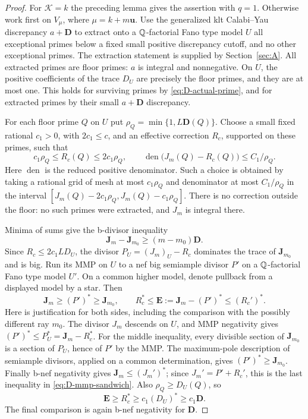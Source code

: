 \begin{proof}
For $\mathcal K=k$ the preceding lemma gives the assertion with $q=1$.
Otherwise work first on $V_\mu$, where $\mu=k+m\mathbf u$.  Use the
generalized klt Calabi--Yau discrepancy $a+\mathbf D$ to extract onto a
$\mathbb Q$-factorial Fano type model $U$ all exceptional primes below a fixed
small positive discrepancy cutoff, and no other exceptional primes.
The extraction statement is supplied by Section~\ref{sec:A}.
All extracted primes are floor primes: $a$ is integral and nonnegative.
On $U$, the positive coefficients of the trace $D_U$ are precisely the
floor primes, and they are at most one.  This holds for surviving primes
by \eqref{eq:D-actual-prime}, and for extracted primes by their small
$a+\mathbf D$ discrepancy.

For each floor prime $Q$ on $U$ put
$\rho_Q=\min\{1,L\mathbf D(Q)\}$.  Choose a small fixed rational
$c_1>0$, with $2c_1\le c$, and an effective correction $R_c$, supported
on these primes, such that
\begin{equation}\label{eq:D-rounding}
 c_1\rho_Q\le R_c(Q)\le2c_1\rho_Q,
 \qquad
 \operatorname{den}\bigl(J_m(Q)-R_c(Q)\bigr)\le C_1/\rho_Q.
\end{equation}
Here $\operatorname{den}$ is the reduced positive denominator.  Such a
choice is obtained by taking a rational grid of mesh at most
$c_1\rho_Q$ and denominator at most $C_1/\rho_Q$ in the interval
$[J_m(Q)-2c_1\rho_Q,J_m(Q)-c_1\rho_Q]$.  There is no correction outside
the floor: no such primes were extracted, and $J_m$ is integral there.

Minima of sums give the b-divisor inequality
\begin{equation}\label{eq:D-height-difference}
 \mathbf J_m-\mathbf J_{m_0}\ge(m-m_0)\mathbf D.
\end{equation}
Since $R_c\le2c_1 L D_U$, the divisor
$P_U=(J_m)_U-R_c$ dominates the trace of $\mathbf J_{m_0}$ and is big.
Run its MMP on $U$ to a nef big semiample divisor $P'$ on a
$\mathbb Q$-factorial Fano type model $U'$.  On a common higher model, denote
pullback from a displayed model by a star.  Then
\begin{equation}\label{eq:D-mmp-sandwich}
 \mathbf J_m\ge(P')^*\ge\mathbf J_{m_0},\qquad
 R_c^*\le \mathbf E:=\mathbf J_m-(P')^*\le(R_c')^*.
\end{equation}
Here is justification for both sides, including the comparison with the
possibly different ray $m_0$.  The divisor $J_m$ descends on $U$, and
MMP negativity gives $(P')^*\le P_U^*=\mathbf J_m-R_c^*$.
For the middle inequality, every divisible section of
$\mathbf J_{m_0}$ is a section of $P_U$, hence of $P'$ by the MMP.
The maximum-pole description of semiample divisors, applied on a common
determination, gives $(P')^*\ge\mathbf J_{m_0}$.  Finally b-nef
negativity gives $\mathbf J_m\le(J_m')^*$; since
$J_m'=P'+R_c'$, this is the last inequality in
\eqref{eq:D-mmp-sandwich}.  Also $\rho_Q\ge D_U(Q)$, so
\[
 \mathbf E\ge R_c^*\ge c_1(D_U)^*\ge c_1\mathbf D.
\]
The final comparison is again b-nef negativity for $\mathbf D$.


\end{proof}
